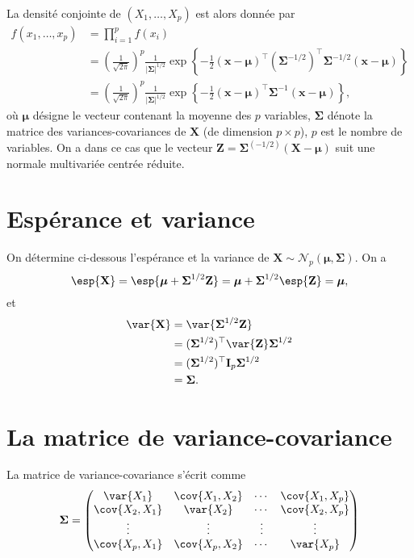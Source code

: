 La densité conjointe de $(X_1,\ldots,X_p)$ est alors donnée par
\begin{align}
f(x_1, \ldots, x_p) &= \prod_{i=1}^p f(x_i) \nonumber\\
  &= \left(\frac{1}{\sqrt{2\pi}}\right)^p \frac{1}{\left|\boldsymbol{\Sigma}\right|^{1/2}} \exp\left\{-\frac{1}{2} (\mathbf{x}- \boldsymbol{\mu})^\top (\boldsymbol{\Sigma}^{-1/2})^\top \boldsymbol{\Sigma}^{-1/2} (\mathbf{x}- \boldsymbol{\mu})\right\}\nonumber\\
 &= \left(\frac{1}{\sqrt{2\pi}}\right)^p \frac{1}{\left|\boldsymbol{\Sigma}\right|^{1/2}} \exp\left\{-\frac{1}{2} (\mathbf{x}- \boldsymbol{\mu})^\top \boldsymbol{\Sigma}^{-1} (\mathbf{x}- \boldsymbol{\mu})\right\},
\label{normalemulti}
\end{align}
où $\boldsymbol{\mu}$ désigne le vecteur contenant la moyenne des $p$ variables, $\boldsymbol{\Sigma}$ dénote la matrice des variances-covariances de $\mathbf{X}$ (de dimension $p \times p$), $p$ est le nombre de variables. On a dans ce cas que le vecteur $\mathbf{Z} =  \boldsymbol{\Sigma}^{(-1/2)} (\mathbf{X}-\boldsymbol{\mu})$ suit une normale multivariée centrée réduite.

\section{Espérance et variance}
\label{sec:EspéranceEtVariance}

On détermine ci-dessous l'espérance et la variance de $\mathbf{X}\sim\mathcal{N}_p (\boldsymbol{\mu}, \boldsymbol{\Sigma})$. On a
$$
\esp{\mathbf{X}} = \esp{\boldsymbol{\mu} + \boldsymbol{\Sigma}^{1/2}\mathbf{Z}}
	 = \boldsymbol{\mu}+ \boldsymbol{\Sigma}^{1/2}\esp{\mathbf{Z}}
	= \boldsymbol{\mu},
$$
et
\begin{align*}
	\var{\mathbf{X}} &= \var{\boldsymbol{\Sigma}^{1/2}\mathbf{Z}} \\
	& =  (\boldsymbol{\Sigma}^{1/2})^\top \var{\mathbf{Z}} \boldsymbol{\Sigma}^{1/2} \\
	&= (\boldsymbol{\Sigma}^{1/2})^\top \mathbf{I}_p \boldsymbol{\Sigma}^{1/2} \\
	&= \boldsymbol{\Sigma}.
\end{align*}

\section{La matrice de variance-covariance}
\label{sec:LaMatriceDesVariancesCovariances}
La matrice de variance-covariance s'écrit comme
$$ 
\boldsymbol{\Sigma} = 
\begin{pmatrix}
\var{X_1} & \cov{X_1,X_2} & \cdots & \cov{X_1,X_p}\\
\cov{X_2,X_1} & \var{X_2} & \cdots & \cov{X_2,X_p}\\
\vdots & \vdots & \vdots & \vdots \\
\cov{X_p,X_1} & \cov{X_p,X_2} & \cdots & \var{X_p}\\
\end{pmatrix}
$$

